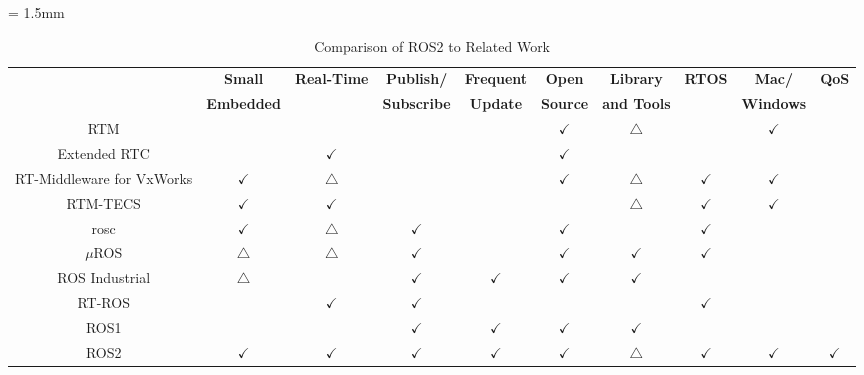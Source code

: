 \documentclass{sig-alternate-05-2015}
\begin{document}
\renewcommand{\arraystretch}{1.0}
\begin{table}[t]
\caption{\label{tb:comparison}
Comparison of ROS2 to Related Work}
\centering
\scriptsize	                    %
\tabcolsep = 1.5mm              %
\begin{tabular}{c|ccccccccc}
\hline
& \textbf{Small} & \textbf{Real-Time} & \textbf{Publish/} & \textbf{Frequent} & \textbf{Open} & \textbf{Library} & \textbf{RTOS} & \textbf{Mac/} & \textbf{QoS}\\
& \textbf{Embedded} &  & \textbf{Subscribe} & \textbf{Update} & \textbf{Source} & \textbf{and Tools} &  & \textbf{Windows} & \\
\hline
\hline
RTM \cite{ando2005rt} & & &  &  & \(\checkmark\) & \(\bigtriangleup\) & & \(\checkmark\) & \\
Extended RTC \cite{chishiro2009extended} &  & \(\checkmark\) &  &  & \(\checkmark\) &  &  &  & \\
RT-Middleware for VxWorks \cite{ikezoeopenrt} & \(\checkmark\) & \(\bigtriangleup\) &  &  & \(\checkmark\) & \(\bigtriangleup\) & \(\checkmark\) & \(\checkmark\) & \\
RTM-TECS \cite{rtmtecs2016} & \(\checkmark\) & \(\checkmark\) &  &  &  & \(\bigtriangleup\) & \(\checkmark\) & \(\checkmark\) & \\
rosc \cite{rosc@roscon2013} & \(\checkmark\) & \(\bigtriangleup\) & \(\checkmark\) &  & \(\checkmark\) &  & \(\checkmark\) &  & \\
\(\mu\)ROS \cite{uros@roscon2013} & \(\bigtriangleup\) & \(\bigtriangleup\) & \(\checkmark\) &  & \(\checkmark\) & \(\checkmark\) & \(\checkmark\) &  & \\
ROS Industrial \cite{rosindustrial} & \(\bigtriangleup\) &  & \(\checkmark\) & \(\checkmark\) & \(\checkmark\) & \(\checkmark\) &  &  & \\
RT-ROS \cite{wei2015rt} &  & \(\checkmark\) & \(\checkmark\) &  &  &  & \(\checkmark\) &  & \\
\hline
ROS1 \cite{quigley2009ros} &  &  & \(\checkmark\) & \(\checkmark\) & \(\checkmark\) & \(\checkmark\) &  &  & \\
ROS2 \cite{ros2_iccps2016} & \(\checkmark\) & \(\checkmark\) & \(\checkmark\) & \(\checkmark\) & \(\checkmark\) & \(\bigtriangleup\) & \(\checkmark\) & \(\checkmark\) & \(\checkmark\)\\
\hline
\end{tabular}
\end{table}
\end{document}
